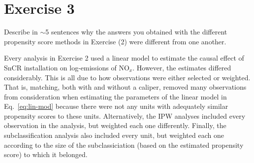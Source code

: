 
\section{Exercise 3}

\begin{quoting}
  Describe in $\sim$5 sentences why the answers you obtained with the
  different propensity score methods in Exercise (2) were different
  from one another.
\end{quoting}

Every analysis in Exercise 2 used a linear model to estimate the
causal effect of SnCR installation on log-emissions of NO$_x$.
However, the estimates differed considerably.  This is all due to how
observations were either selected or weighted.  That is, matching,
both with and without a caliper, removed many observations from
consideration when estimating the parameters of the linear model in
Eq.~\eqref{eq:lin-mod} because there were not any units with
adequately similar propensity scores to these units.  Alternatively,
the IPW analyses included every observation in the analysis, but
weighted each one differently.  Finally, the subclassification
analysis also included every unit, but weighted each one according to
the size of the subclassiciation (based on the estimated propensity
score) to which it belonged.

